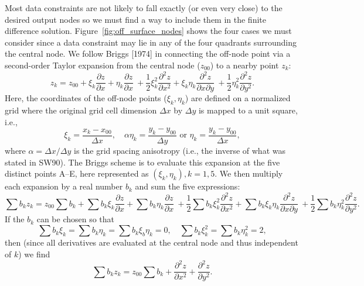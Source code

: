 \documentclass[12pt,letterpaper,margin=0.5in]{article}
\begin{document}
Most data constraints are not likely to fall exactly (or even very close) to the
desired output nodes so we must find a way to include them in the finite difference
solution.  Figure~\ref{fig:off_surface_nodes} shows the four cases we must consider since
a data constraint may lie in any of the four quadrants surrounding the central node.
We follow Briggs [1974] in connecting the off-node point via a
second-order Taylor expansion from the central node ($z_{00}$) to a nearby point $z_k$:
\begin{equation}
	z_k = z_{00} + \xi_k \frac{\partial z}{\partial x} + \eta_k \frac{\partial z}{\partial x} \
	+ \frac{1}{2} \xi^2_k \frac{\partial^2 z}{\partial x^2} + \xi_k \eta_k \frac{\partial^2 z}{\partial x \partial y} \
	+ \frac{1}{2}  \eta^2_k \frac{\partial^2 z}{\partial y^2}.
\end{equation}
Here, the coordinates of the off-node points ($\xi_k, \eta_k$) are defined on a normalized
grid where the original grid cell dimension $\Delta x$ by $\Delta y$ is mapped to a unit square, i.e.,
\begin{equation}
\xi_k = \frac{x_k-x_{00}}{\Delta x}, \quad \alpha \eta_k = \frac{y_k-y_{00}}{\Delta y} \mbox{ or } \eta_k = \frac{y_k-y_{00}}{\Delta x},
\end{equation}
where $\alpha = \Delta x/ \Delta y$ is the grid spacing anisotropy (i.e., the inverse of what was stated in SW90).
The Briggs scheme is to evaluate this expansion at the five distinct points A--E, here represented as $(\xi_k, \eta_k), k = 1,5$.
We then multiply each expansion by a real number $b_k$ and sum the five expressions:
\begin{equation}
	\sum b_k z_k = z_{00}\sum b_k  + \sum b_k \xi_k \frac{\partial z}{\partial x} + \sum b_k \eta_k \frac{\partial z}{\partial x} \
	+ \frac{1}{2} \sum b_k \xi^2_k \frac{\partial^2 z}{\partial x^2} + \sum b_k \xi_k \eta_k \frac{\partial^2 z}{\partial x \partial y} \
	+ \frac{1}{2} \sum b_k \eta^2_k \frac{\partial^2 z}{\partial y^2}.
\end{equation}
If the $b_k$ can be chosen so that
\begin{equation}
\sum b_k \xi_k = \sum b_k \eta_k = \sum b_k \xi_b \eta_k = 0, \quad \sum b_k \xi^2_k = \sum b_k \eta^2_k = 2,
\label{eq:define}
\end{equation}
then (since all derivatives are evaluated at the central node and thus independent of $k$) we find
\begin{equation}
	\sum b_k z_k = z_{00}\sum b_k  + \frac{\partial^2 z}{\partial x^2} + \frac{\partial^2 z}{\partial y^2}.
\end{equation}
\end{document}
